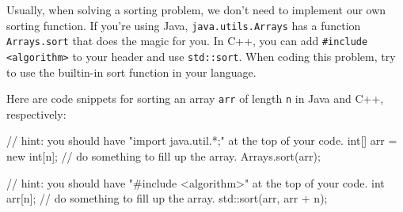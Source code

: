 Usually, when solving a sorting problem, we don't need to implement our own sorting function. If you're using Java, \texttt{java.utils.Arrays} has a function \texttt{Arrays.sort} that does the magic for you. In C++, you can add \texttt{\#include <algorithm>} to your header and use \texttt{std::sort}. When coding this problem, try to use the builtin-in sort function in your language.

Here are code snippets for sorting an array \texttt{arr} of length \texttt{n} in Java and C++, respectively:

\begin{mylstlisting}
// hint: you should have "import java.util.*;" at the top of your code.
int[] arr = new int[n];
// do something to fill up the array.
Arrays.sort(arr);
\end{mylstlisting}

\begin{mylstlisting}
// hint: you should have "#include <algorithm>" at the top of your code.
int arr[n];
// do something to fill up the array.
std::sort(arr, arr + n);
\end{mylstlisting}
